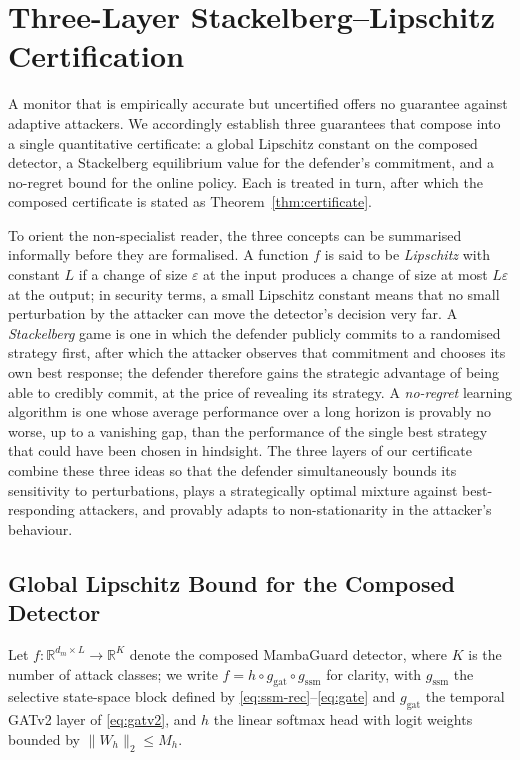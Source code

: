 \documentclass[journal,10pt,twocolumn]{IEEEtran}
\newcommand{\R}{\mathbb{R}}
\begin{document}
\section{Three-Layer Stackelberg--Lipschitz Certification}
\label{sec:certification}

A monitor that is empirically accurate but uncertified offers no guarantee against adaptive attackers. We accordingly establish three guarantees that compose into a single quantitative certificate: a global Lipschitz constant on the composed detector, a Stackelberg equilibrium value for the defender's commitment, and a no-regret bound for the online policy. Each is treated in turn, after which the composed certificate is stated as Theorem~\ref{thm:certificate}.

To orient the non-specialist reader, the three concepts can be summarised informally before they are formalised. A function $f$ is said to be \emph{Lipschitz} with constant $L$ if a change of size $\varepsilon$ at the input produces a change of size at most $L\varepsilon$ at the output; in security terms, a small Lipschitz constant means that no small perturbation by the attacker can move the detector's decision very far. A \emph{Stackelberg} game is one in which the defender publicly commits to a randomised strategy first, after which the attacker observes that commitment and chooses its own best response; the defender therefore gains the strategic advantage of being able to credibly commit, at the price of revealing its strategy. A \emph{no-regret} learning algorithm is one whose average performance over a long horizon is provably no worse, up to a vanishing gap, than the performance of the single best strategy that could have been chosen in hindsight. The three layers of our certificate combine these three ideas so that the defender simultaneously bounds its sensitivity to perturbations, plays a strategically optimal mixture against best-responding attackers, and provably adapts to non-stationarity in the attacker's behaviour.

\subsection{Global Lipschitz Bound for the Composed Detector}
\label{sec:lipschitz}
Let $f:\R^{d_{m}\times L}\to\R^{K}$ denote the composed MambaGuard detector, where $K$ is the number of attack classes; we write $f=h\circ g_{\text{gat}}\circ g_{\text{ssm}}$ for clarity, with $g_{\text{ssm}}$ the selective state-space block defined by \eqref{eq:ssm-rec}--\eqref{eq:gate} and $g_{\text{gat}}$ the temporal GATv2 layer of \eqref{eq:gatv2}, and $h$ the linear softmax head with logit weights bounded by $\|W_{h}\|_{2}\le M_{h}$.
\end{document}
